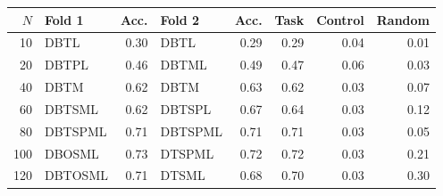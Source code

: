 \begin{tabular}{@{}rlrlrrrr@{}}
\toprule
$N$ & Fold 1 & Acc. & Fold 2 & Acc. & Task & Control & Random \\
\midrule
10 & DBTL & 0.30 & DBTL & 0.29 & 0.29 & 0.04 & 0.01 \\
20 & DBTPL & 0.46 & DBTML & 0.49 & 0.47 & 0.06 & 0.03 \\
40 & DBTM & 0.62 & DBTM & 0.63 & 0.62 & 0.03 & 0.07 \\
60 & DBTSML & 0.62 & DBTSPL & 0.67 & 0.64 & 0.03 & 0.12 \\
80 & DBTSPML & 0.71 & DBTSPML & 0.71 & 0.71 & 0.03 & 0.05 \\
100 & DBOSML & 0.73 & DTSPML & 0.72 & 0.72 & 0.03 & 0.21 \\
120 & DBTOSML & 0.71 & DTSML & 0.68 & 0.70 & 0.03 & 0.30 \\
\bottomrule
\end{tabular}
